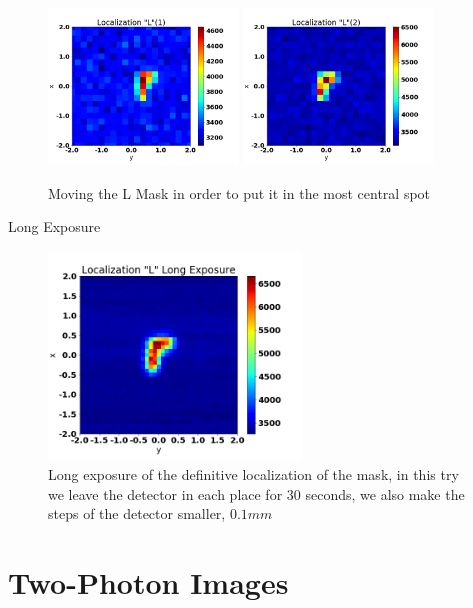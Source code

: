 \begin{figure}[h!]
\centering
{  \includegraphics[width=0.45\textwidth]{Figures/localizationL1.png} }
{  \includegraphics[width=0.45\textwidth]{Figures/localizationL2.png} }
\caption{Moving the L Mask in order to put it in the most central spot}
 \label{fig:localizationL}
\end{figure}
Long Exposure
\begin{figure}[h!]
\centering
\includegraphics[width=0.6\textwidth]{Figures/localizationLLong.png} 
\caption{Long exposure of the definitive localization of the mask, in this try we leave the 
detector in each place for 30 seconds, we also make the steps of the detector smaller, $0.1mm$}
\label{fig:localizationDef}
\end{figure}

\section{Two-Photon Images}


